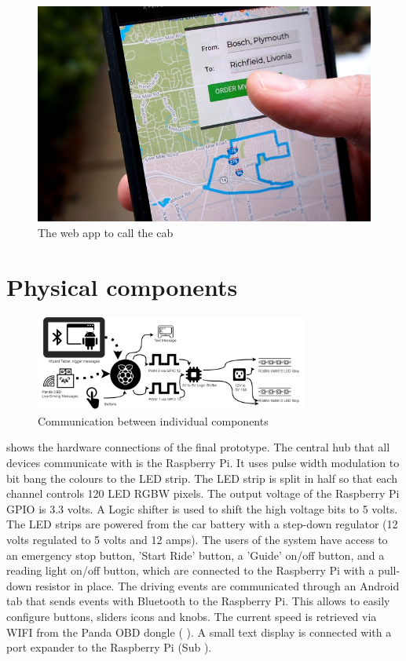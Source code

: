 \begin{figure}
    \includegraphics[height=0.31\textwidth]{fig/capp}
    \caption[Call a Cab App]{The web app to call the cab}
    \label{fig:capp}
\end{figure}

\section{Physical components}
\label{sec:physical}

\begin{figure}
    \includegraphics[width=0.8\textwidth]{fig/wizardfinal}
    \caption[Communication Overview]{Communication between individual components}
    \label{fig:communication}
\end{figure}

\emph{} shows the hardware connections of the final prototype. The central hub that all devices communicate with is the Raspberry Pi. It uses pulse width modulation to bit bang the colours to the LED strip. The LED strip is split in half so that each channel controls 120 LED RGBW pixels. The output voltage of the Raspberry Pi GPIO is 3.3 volts. A Logic shifter is used to shift the high voltage bits to 5 volts. The LED strips are powered from the car battery with a step-down regulator (12 volts regulated to 5 volts and 12 amps). The users of the system have access to an emergency stop button, 'Start Ride' button, a 'Guide' on/off button, and a reading light on/off button, which are connected to the Raspberry Pi with a pull-down resistor in place. The driving events are communicated through an Android tab that sends events with Bluetooth to the Raspberry Pi. This allows to easily configure buttons, sliders icons and knobs. The current speed is retrieved via WIFI from the Panda OBD dongle ( \emph{}). A small text display is connected with a port expander to the Raspberry Pi (Sub \emph{}). 

